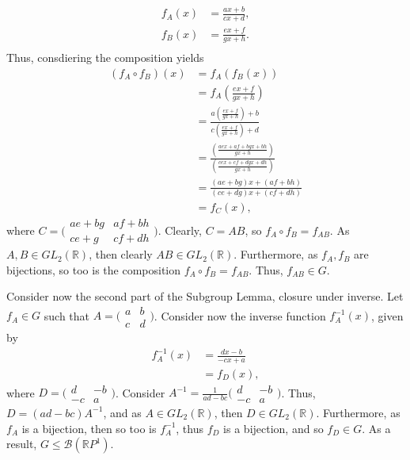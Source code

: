\documentclass[a4paper,11pt]{article}
\newcommand{\ds}{\displaystyle}
\begin{document}
{{\begin{enumerate}[leftmargin=*]
\begin{enumerate}
					\begin{align*}
						f_A(x) & = \frac{ax + b}{cx + d},\\
						f_B(x) & = \frac{ex + f}{gx + h}.\\
					\end{align*}
					Thus, consdiering the composition yields
					\begin{align*}
						(f_A \circ f_B)(x) & = f_A(f_B(x))\\
										   & = f_A\left(\frac{ex + f}{gx + h}\right)\\
										   & = \frac{a\left(\frac{ex + f}{gx + h}\right) + b}{c\left(\frac{ex + f}{gx + h}\right) + d}\\
										   & = \frac{\left(\frac{aex + af + bgx + bh}{gx + h}\right)}{\left(\frac{cex + cf + dgx + dh}{gx + h}\right)}\\
										   & = \frac{(ae + bg)x + (af + bh)}{(ce + dg)x + (cf + dh)}\\
										   & = f_C(x),
					\end{align*}
					where $\ds{C = \bigl( \begin{smallmatrix}ae + bg & af + bh\\ ce + g & cf + dh\end{smallmatrix}\bigr)}$. Clearly, $\ds{C = AB}$, so $\ds{f_A \circ f_B = f_{AB}}$. As $\ds{A,B \in GL_2(\mathbb{R})}$, then clearly $\ds{AB \in GL_2(\mathbb{R})}$. Furthermore, as $\ds{f_A,f_B}$ are bijections, so too is the composition $\ds{f_A \circ f_B = f_{AB}}$. Thus, $\ds{f_{AB} \in G}$.

					\pagebreak

					Consider now the second part of the Subgroup Lemma, closure under inverse. Let $\ds{f_A \in G}$ such that $\ds{A = \bigl( \begin{smallmatrix}a & b\\ c & d\end{smallmatrix}\bigr)}$. Consider now the inverse function $\ds{f_A^{-1}(x)}$, given by 
					\begin{align*}
						f_A^{-1}(x) & = \frac{dx - b}{-cx + a}\\ 
								  & = f_D(x),
					\end{align*}
					where $\ds{D = \bigl( \begin{smallmatrix}d & -b\\ -c & a\end{smallmatrix}\bigr)}$.  Consider $\ds{A^{-1} = \frac{1}{ad-bc}\bigl( \begin{smallmatrix}d & -b\\ -c & a\end{smallmatrix}\bigr)}$. Thus, $\ds{D = (ad-bc)A^{-1}}$, and as $\ds{A \in GL_2(\mathbb{R})}$, then $\ds{D \in GL_2(\mathbb{R})}$. Furthermore, as $\ds{f_A}$ is a bijection, then so too is $\ds{f_A^{-1}}$, thus $\ds{f_D}$ is a bijection, and so $\ds{f_D \in G}$. As a result, $\ds{G \leq \mathcal{B}(\mathbb{R}P^1)}$.
			\end{enumerate}


\end{enumerate}}}
\end{document}
